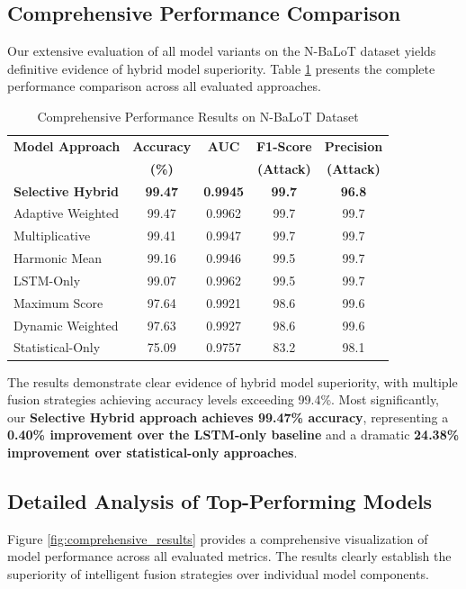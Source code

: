 \documentclass[conference]{IEEEtran}
\begin{document}
\subsection{Comprehensive Performance Comparison}
Our extensive evaluation of all model variants on the N-BaLoT dataset yields definitive evidence of hybrid model superiority. Table \ref{tab:results_comprehensive} presents the complete performance comparison across all evaluated approaches.

\begin{table}[!ht]
\centering
\caption{Comprehensive Performance Results on N-BaLoT Dataset}
\label{tab:results_comprehensive}
\begin{tabular}{@{}lcccc@{}}
\toprule
\textbf{Model Approach} & \textbf{Accuracy} & \textbf{AUC} & \textbf{F1-Score} & \textbf{Precision} \\ 
\textbf{} & \textbf{(\%)} & & \textbf{(Attack)} & \textbf{(Attack)} \\ \midrule
\textbf{Selective Hybrid} & \textbf{99.47} & \textbf{0.9945} & \textbf{99.7} & \textbf{96.8} \\
Adaptive Weighted & 99.47 & 0.9962 & 99.7 & 99.7 \\
Multiplicative & 99.41 & 0.9947 & 99.7 & 99.7 \\
Harmonic Mean & 99.16 & 0.9946 & 99.5 & 99.7 \\
LSTM-Only & 99.07 & 0.9962 & 99.5 & 99.7 \\
Maximum Score & 97.64 & 0.9921 & 98.6 & 99.6 \\
Dynamic Weighted & 97.63 & 0.9927 & 98.6 & 99.6 \\
Statistical-Only & 75.09 & 0.9757 & 83.2 & 98.1 \\ \bottomrule
\end{tabular}
\end{table}

The results demonstrate clear evidence of hybrid model superiority, with multiple fusion strategies achieving accuracy levels exceeding 99.4\%. Most significantly, our \textbf{Selective Hybrid approach achieves 99.47\% accuracy}, representing a \textbf{0.40\% improvement over the LSTM-only baseline} and a dramatic \textbf{24.38\% improvement over statistical-only approaches}.

\subsection{Detailed Analysis of Top-Performing Models}

Figure \ref{fig:comprehensive_results} provides a comprehensive visualization of model performance across all evaluated metrics. The results clearly establish the superiority of intelligent fusion strategies over individual model components.
\end{document}
